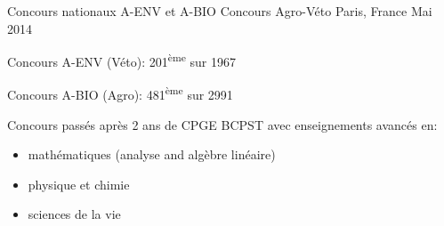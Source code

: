 \begin{cventries}
    \cventry
    {Concours nationaux A-ENV et A-BIO } %
    {Concours Agro-Véto} %
    {Paris, France} %
    {Mai 2014} %
    {
      \begin{cvitems} %
        \item {Concours A-ENV (Véto): 201\textsuperscript{ème} sur 1967}
        \item {Concours A-BIO (Agro): 481\textsuperscript{ème} sur 2991}
        \item {Concours passés après 2 ans de CPGE BCPST avec enseignements avancés en: \begin{itemize}
          \item mathématiques (analyse and algèbre linéaire)
          \item physique et chimie
          \item sciences de la vie
        \end{itemize}}
      \end{cvitems}
    }
\end{cventries}
